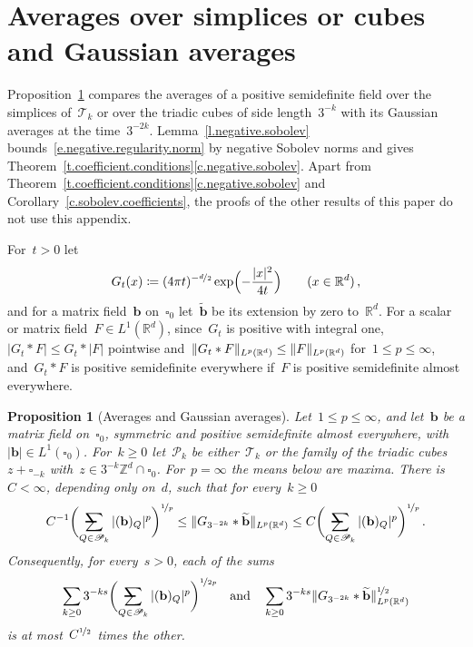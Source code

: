 \documentclass[11pt,letterpaper]{article}
\makeatletter
\numberwithin{equation}{section}
\newtheorem{proposition}[theorem]{Proposition}
\theoremstyle{definition}
\newcommand{\Rd}{\mathbb{R}^d}
\newcommand{\Zd}{\mathbb{Z}^d}
\newcommand{\nf}{\nicefrac}
\newcommand{\qand}{\quad\mbox{and}\quad}
\newcommand{\cu}{\square}
\DeclarePairedDelimiter{\norm}{\lVert}{\rVert}
\newcommand{\avsum}{\mathop{\mathpalette\avsuminner\relax}\displaylimits}
\newcommand\avsuminner[2]{%
	{\sbox0{$\m@th#1\sum$}%
		\vphantom{\usebox0}%
		\ooalign{%
			\hidewidth
			\smash{\,\rule[.23em]{8.8pt}{1.1pt} \relax}%
			\hidewidth\cr
			$\m@th#1\sum$\cr
		}%
	}%
}
\makeatother
\begin{document}
\section{Averages over simplices or cubes and Gaussian averages}
\label{a.besov}

Proposition~\ref{p.besov.averages} compares the averages of a positive semidefinite field over the simplices of~$\mathscr T_k$ or over the triadic cubes of side length~$3^{-k}$ with its Gaussian averages at the time~$3^{-2k}$. Lemma~\ref{l.negative.sobolev} bounds~\eqref{e.negative.regularity.norm} by negative Sobolev norms and gives Theorem~\ref{t.coefficient.conditions}\ref{c.negative.sobolev}. Apart from Theorem~\ref{t.coefficient.conditions}\ref{c.negative.sobolev} and Corollary~\ref{c.sobolev.coefficients}, the proofs of the other results of this paper do not use this appendix.

\smallskip

For~$t>0$ let
\begin{equation*}
	G_t(x)\coloneqq(4\pi t)^{-\nf d2}\exp\Bigl(-\frac{|x|^2}{4t}\Bigr)\qquad(x\in\Rd)\,,
\end{equation*}
and for a matrix field~$\mathbf b$ on~$\cu_0$ let~$\widetilde{\mathbf b}$ be its extension by zero to~$\Rd$. For a scalar or matrix field~$F\in L^1(\Rd)$, since~$G_t$ is positive with integral one,~$|G_t*F|\leq G_t*|F|$ pointwise and~$\norm{G_t*F}_{L^p(\Rd)}\leq\norm{F}_{L^p(\Rd)}$ for~$1\leq p\leq\infty$, and~$G_t*F$ is positive semidefinite everywhere if~$F$ is positive semidefinite almost everywhere.

\begin{proposition}[Averages and Gaussian averages]
\label{p.besov.averages}
Let~$1\leq p\leq\infty$, and let~$\mathbf b$ be a matrix field on~$\cu_0$, symmetric and positive semidefinite almost everywhere, with~$|\mathbf b|\in L^1(\cu_0)$. For~$k\geq0$ let~$\mathscr P_k$ be either~$\mathscr T_k$ or the family of the triadic cubes~$z+\cu_{-k}$ with~$z\in3^{-k}\Zd\cap\cu_0$. For~$p=\infty$ the means below are maxima. There is~$C<\infty$, depending only on~$d$, such that for every~$k\geq0$
\begin{equation}
	C^{-1}\biggl(\avsum_{Q\in\mathscr P_k}|(\mathbf b)_Q|^p\biggr)^{\nf1p}\leq\norm{G_{3^{-2k}}*\widetilde{\mathbf b}}_{L^p(\Rd)}\leq C\biggl(\avsum_{Q\in\mathscr P_k}|(\mathbf b)_Q|^p\biggr)^{\nf1p}\,.
	\label{e.besov.heat}
\end{equation}
Consequently, for every~$s>0$, each of the sums
\begin{equation}
	\sum_{k\geq0}3^{-ks}\biggl(\avsum_{Q\in\mathscr P_k}|(\mathbf b)_Q|^p\biggr)^{\nf1{2p}}\qand\sum_{k\geq0}3^{-ks}\norm{G_{3^{-2k}}*\widetilde{\mathbf b}}_{L^p(\Rd)}^{\nf12}
	\label{e.besov.averages}
\end{equation}
is at most~$C^{\nf12}$ times the other.
\end{proposition}
\end{document}
